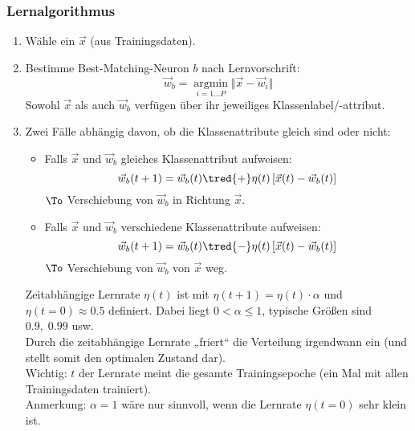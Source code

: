 \subsubsection*{Lernalgorithmus}
\begin{enumerate}
\item Wähle ein $\vec{x}$ (aus Trainingsdaten).
\item Bestimme Best-Matching-Neuron $b$ nach Lernvorschrift:
$$\vec{w}_b=\underset{i=1\ldots P}{\operatorname{argmin}} \Vert \vec{x}-\vec{w}_i \Vert$$
Sowohl $\vec{x}$ als auch $\vec{w}_b$ verfügen über ihr jeweiliges Klassenlabel/-attribut.
\item Zwei Fälle abhängig davon, ob die Klassenattribute gleich sind oder nicht:
\begin{itemize}
\item Falls $\vec{x}$ und $\vec{w}_b$ gleiches Klassenattribut aufweisen:
$$\vec{w}_b(t+1) = \vec{w}_b(t)\tred{+}\eta(t)\left[ \vec{x}(t)-\vec{w}_b(t)\right]$$
$\To$ Verschiebung von $\vec{w}_b$ in Richtung $\vec{x}$.
\item Falls $\vec{x}$ und $\vec{w}_b$ verschiedene Klassenattribute aufweisen: 
$$\vec{w}_b(t+1) = \vec{w}_b(t)\tred{-}\eta(t)\left[ \vec{x}(t)-\vec{w}_b(t)\right]$$
$\To$ Verschiebung von $\vec{w}_b$ von $\vec{x}$ weg.
\end{itemize}
Zeitabhängige Lernrate $\eta(t)$ ist mit $\eta(t+1)=\eta(t)\cdot \alpha$ und $\eta(t=0)\approx 0.5$ definiert. Dabei liegt $0<\alpha\leq 1$, typische Größen sind $0.9,\; 0.99$ usw.\\
Durch die zeitabhängige Lernrate „friert“ die Verteilung irgendwann ein (und stellt somit den optimalen Zustand dar).\\
Wichtig: $t$ der Lernrate meint die gesamte Trainingsepoche (ein Mal mit allen Trainingsdaten trainiert).\\
Anmerkung: $\alpha=1$ wäre nur sinnvoll, wenn die Lernrate $\eta(t=0)$ sehr klein ist.
\end{enumerate}

